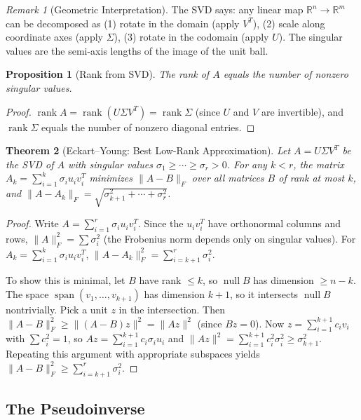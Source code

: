 \documentclass[11pt,a4paper]{article}
\theoremstyle{definition}
\theoremstyle{plain}
\newtheorem{theorem}{Theorem}[section]
\newtheorem{proposition}[theorem]{Proposition}
\theoremstyle{remark}
\newtheorem{remark}{Remark}[section]
\newcommand{\R}{\mathbb{R}}
\DeclareMathOperator{\rank}{rank}
\DeclareMathOperator{\nullspace}{null}
\DeclareMathOperator{\Span}{span}
\begin{document}
\begin{remark}[Geometric Interpretation]
The SVD says: any linear map $\R^n \to \R^m$ can be decomposed as (1) rotate in the domain
(apply $V^T$), (2) scale along coordinate axes (apply $\Sigma$), (3) rotate in the codomain
(apply $U$). The singular values are the semi-axis lengths of the image of the unit ball.
\end{remark}

\begin{proposition}[Rank from SVD]
\label{prop:rank_svd}
The rank of $A$ equals the number of nonzero singular values.
\end{proposition}

\begin{proof}
$\rank A = \rank(U \Sigma V^T) = \rank \Sigma$ (since $U$ and $V$ are invertible), and
$\rank \Sigma$ equals the number of nonzero diagonal entries.
\end{proof}

\begin{theorem}[Eckart--Young: Best Low-Rank Approximation]
\label{thm:eckart_young}
Let $A = U\Sigma V^T$ be the SVD of $A$ with singular values $\sigma_1 \geq \cdots \geq \sigma_r > 0$.
For any $k < r$, the matrix $A_k = \sum_{i=1}^k \sigma_i u_i v_i^T$ minimizes $\|A - B\|_F$
over all matrices $B$ of rank at most $k$, and $\|A - A_k\|_F = \sqrt{\sigma_{k+1}^2 + \cdots + \sigma_r^2}$.
\end{theorem}

\begin{proof}
Write $A = \sum_{i=1}^r \sigma_i u_i v_i^T$. Since the $u_i v_i^T$ have orthonormal columns
and rows, $\|A\|_F^2 = \sum \sigma_i^2$ (the Frobenius norm depends only on singular values).
For $A_k = \sum_{i=1}^k \sigma_i u_i v_i^T$,
$\|A - A_k\|_F^2 = \sum_{i=k+1}^r \sigma_i^2$.

To show this is minimal, let $B$ have rank $\leq k$, so $\nullspace B$ has dimension $\geq n - k$.
The space $\Span(v_1, \ldots, v_{k+1})$ has dimension $k+1$, so it intersects
$\nullspace B$ nontrivially. Pick a unit $z$ in the intersection. Then
$\|A - B\|_F^2 \geq \|(A-B)z\|^2 = \|Az\|^2$
(since $Bz = 0$). Now $z = \sum_{i=1}^{k+1} c_i v_i$ with $\sum c_i^2 = 1$, so
$Az = \sum_{i=1}^{k+1} c_i \sigma_i u_i$ and $\|Az\|^2 = \sum_{i=1}^{k+1} c_i^2 \sigma_i^2
\geq \sigma_{k+1}^2$. Repeating this argument with appropriate subspaces yields
$\|A - B\|_F^2 \geq \sum_{i=k+1}^r \sigma_i^2$.
\end{proof}

\subsection{The Pseudoinverse}
\label{subsec:pseudoinverse}
\end{document}
